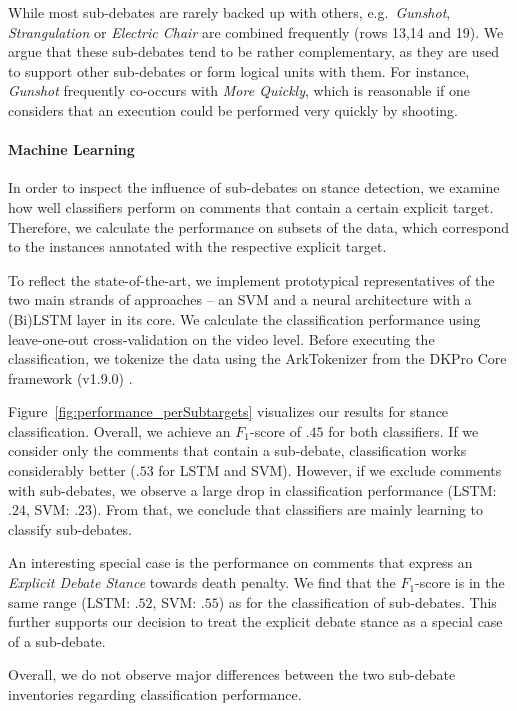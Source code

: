 \documentclass[11pt]{article}
\begin{document}
While most sub-debates are rarely backed up with others, e.g.\ \textit{Gunshot}, \textit{Strangulation} or \textit{Electric Chair} are combined frequently (rows 13,14 and 19). 
We argue that these sub-debates tend to be rather complementary, as they are used to support other sub-debates or form logical units with them.
For instance, \textit{Gunshot} frequently co-occurs with \textit{More Quickly}, which is reasonable if one considers that an execution could be performed very quickly by shooting.

\paragraph{Machine Learning}
In order to inspect the influence of sub-debates on stance detection, we examine how well classifiers perform on comments that contain a certain explicit target. 
Therefore, we calculate the performance on subsets of the data, which correspond to the instances annotated with the respective explicit target.

To reflect the state-of-the-art, we implement prototypical representatives of the two main strands of approaches -- an SVM and a neural architecture with a (Bi)LSTM layer in its core. 
We calculate the classification performance using leave-one-out cross-validation on the video level.
Before executing the classification, we tokenize the data using the ArkTokenizer \cite{gimpel2011part} from the DKPro Core framework (v1.9.0) \cite{eckartdecastilho-gurevych:2014:OIAF4HLT}.

Figure~\ref{fig:performance_perSubtargets} visualizes our results for stance classification.
Overall, we achieve an $F_1$-score of $.45$ for both classifiers.
If we consider only the comments that contain a sub-debate, classification works considerably better ($.53$ for LSTM and SVM).
However, if we exclude comments with sub-debates, we observe a large drop in classification performance (LSTM: $.24$, SVM: $.23$).
From that, we conclude that classifiers are mainly learning to classify sub-debates.

An interesting special case is the performance on comments that express an \textit{Explicit Debate Stance} towards death penalty.
We find that the $F_1$-score is in the same range (LSTM: $.52$, SVM: $.55$) as for the classification of sub-debates.
This further supports our decision to treat the explicit debate stance as a special case of a sub-debate.

Overall, we do not observe major differences between the two sub-debate inventories regarding classification performance.
\end{document}
